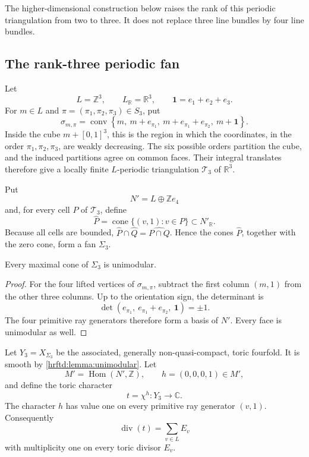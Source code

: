 The higher-dimensional construction below raises the rank of this periodic
triangulation from two to three.  It does not replace three line bundles by
four line bundles.

\subsection{The rank-three periodic fan}
\label{hrftd:periodic-fan}

Let
\[
 L=\mathbb Z^3,\qquad L_{\mathbb R}=\mathbb R^3,\qquad
 \mathbf 1=e_1+e_2+e_3.
\]
For \(m\in L\) and
\(\pi=(\pi_1,\pi_2,\pi_3)\in S_3\), put
\begin{equation}
 \sigma_{m,\pi}
 =
 \operatorname{conv}\left\{
 m,\ m+e_{\pi_1},\ m+e_{\pi_1}+e_{\pi_2},\
 m+\mathbf 1
 \right\}.
 \label{hrftd:eq:kuhn-simplex}
\end{equation}
Inside the cube \(m+[0,1]^3\), this is the region in which the coordinates,
in the order \(\pi_1,\pi_2,\pi_3\), are weakly decreasing.  The six possible
orders partition the cube, and the induced partitions agree on common
faces.  Their integral translates therefore give a locally finite
\(L\)-periodic triangulation \(\mathcal T_3\) of \(\mathbb R^3\).

Put
\[
 N'=L\oplus\mathbb Z e_4
\]
and, for every cell \(P\) of \(\mathcal T_3\), define
\begin{equation}
 \widehat P
 =
 \operatorname{cone}\{(v,1):v\in P\}
 \subset N'_{\mathbb R}.
 \label{hrftd:eq:cone-over-cell}
\end{equation}
Because all cells are bounded,
\(\widehat P\cap\widehat Q=\widehat{P\cap Q}\).  Hence the cones
\(\widehat P\), together with the zero cone, form a fan
\(\Sigma_3\).

\begin{lemma}[Unimodularity]
\label{hrftd:lemma:unimodular}
Every maximal cone of \(\Sigma_3\) is unimodular.
\end{lemma}

\begin{proof}
For the four lifted vertices of \(\sigma_{m,\pi}\), subtract the first
column \((m,1)\) from the other three columns.  Up to the orientation sign,
the determinant is
\[
 \det\left(
 e_{\pi_1},\
 e_{\pi_1}+e_{\pi_2},\
 \mathbf 1
 \right)=\pm1.
\]
The four primitive ray generators therefore form a basis of \(N'\).
Every face is unimodular as well.
\end{proof}

Let \(Y_3=X_{\Sigma_3}\) be the associated, generally non-quasi-compact,
toric fourfold.  It is smooth by
\cref{hrftd:lemma:unimodular}.  Let
\[
 M'=\operatorname{Hom}(N',\mathbb Z),\qquad
 h=(0,0,0,1)\in M',
\]
and define the toric character
\begin{equation}
 t=\chi^h:Y_3\longrightarrow\mathbb C.
 \label{hrftd:eq:toric-parameter}
\end{equation}
The character \(h\) has value one on every primitive ray generator
\((v,1)\).  Consequently
\begin{equation}
 \operatorname{div}(t)=\sum_{v\in L}E_v
 \label{hrftd:eq:reduced-central-divisor}
\end{equation}
with multiplicity one on every toric divisor \(E_v\).


